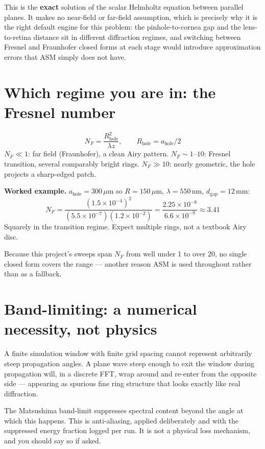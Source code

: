 \documentclass[11pt]{report}
\newcommand{\ahole}{a_{\text{hole}}}
\newcommand{\dgap}{d_{\text{gap}}}
\begin{document}
This is the \textbf{exact} solution of the scalar Helmholtz equation between parallel planes.
It makes no near-field or far-field assumption, which is precisely why it is the right default
engine for this problem: the pinhole-to-cornea gap and the lens-to-retina distance sit in
different diffraction regimes, and switching between Fresnel and Fraunhofer closed forms at
each stage would introduce approximation errors that ASM simply does not have.

\section{Which regime you are in: the Fresnel number}
\begin{equation}
N_F = \frac{R_{\text{hole}}^2}{\lambda z}, \qquad R_{\text{hole}} = \ahole/2
\label{eq:NF}
\end{equation}
$N_F \ll 1$: far field (Fraunhofer), a clean Airy pattern. $N_F \sim 1$--$10$: Fresnel transition,
several comparably bright rings. $N_F \gg 10$: nearly geometric, the hole projects a sharp-edged
patch.

\textbf{Worked example.} $\ahole = 300\,\mu$m so $R = 150\,\mu$m, $\lambda = 550$\,nm,
$\dgap = 12$\,mm:
\begin{equation}
N_F = \frac{(1.5\times10^{-4})^2}{(5.5\times10^{-7})(1.2\times10^{-2})}
= \frac{2.25\times10^{-8}}{6.6\times10^{-9}} \approx 3.41
\end{equation}
Squarely in the transition regime. Expect multiple rings, not a textbook Airy disc.

Because this project's sweeps span $N_F$ from well under 1 to over 20, no single closed form
covers the range --- another reason ASM is used throughout rather than as a fallback.

\section{Band-limiting: a numerical necessity, not physics}

A finite simulation window with finite grid spacing cannot represent arbitrarily steep
propagation angles. A plane wave steep enough to exit the window during propagation will,
in a discrete FFT, wrap around and re-enter from the opposite side --- appearing as spurious
fine ring structure that looks exactly like real diffraction.

The Matsushima band-limit suppresses spectral content beyond the angle at which this happens.
This is anti-aliasing, applied deliberately and with the suppressed energy fraction logged
per run. It is not a physical loss mechanism, and you should say so if asked.
\end{document}
